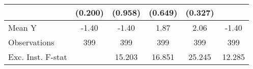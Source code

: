 {\begin{tabular}{l*{5}{c}}
            &     (0.200)         &     (0.958)         &     (0.649)         &     (0.327)         &                     \\
\midrule
Mean Y      &       -1.40         &       -1.40         &        1.87         &        2.06         &       -1.40         \\
Observations&         399         &         399         &         399         &         399         &         399         \\
Exc. Inst. F-stat&                     &      15.203         &      16.851         &      25.245         &      12.285         \\
\bottomrule
\end{tabular}
}
